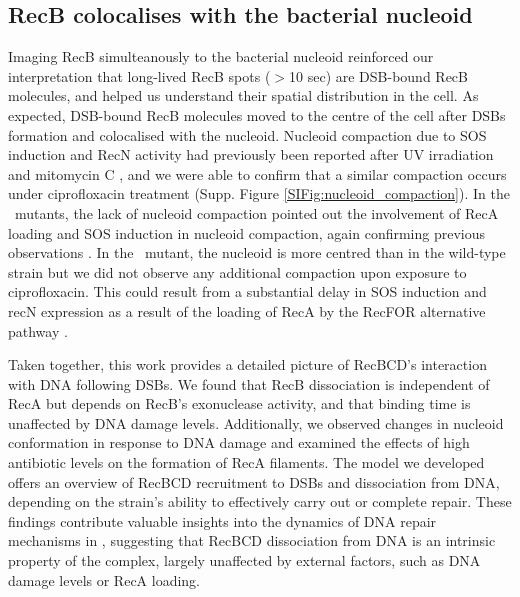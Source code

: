 \subsection*{RecB colocalises with the bacterial nucleoid}
Imaging RecB simulteanously to the bacterial nucleoid reinforced our interpretation that long-lived RecB spots ($>$10 sec) are DSB-bound RecB molecules, and helped us understand their spatial distribution in the cell. As expected, DSB-bound RecB molecules moved to the centre of the cell after DSBs formation and colocalised with the nucleoid. Nucleoid compaction due to SOS induction and RecN activity had previously been reported after UV irradiation and mitomycin C \cite{Odsbu2014,Vickridge2017}, and we were able to confirm that a similar compaction occurs under ciprofloxacin treatment (Supp. Figure \ref{SIFig:nucleoid_compaction}). In the \dreca\ mutants, the lack of nucleoid compaction pointed out the involvement of RecA loading and SOS induction in nucleoid compaction, again confirming previous observations \cite{Odsbu2014,Vickridge2017}. In the \geneteneighty\ mutant, the nucleoid is more centred than in the wild-type strain but we did not observe any additional compaction upon exposure to ciprofloxacin. This could result from a substantial delay in SOS induction and recN expression as a result of the loading of RecA by the RecFOR alternative pathway \cite{Lepore2025}.

Taken together, this work provides a detailed picture of RecBCD's interaction with DNA following DSBs. We found that RecB dissociation is independent of RecA but depends on RecB's exonuclease activity, and that binding time is unaffected by DNA damage levels. Additionally, we observed changes in nucleoid conformation in response to DNA damage and examined the effects of high antibiotic levels on the formation of RecA filaments. The model we developed offers an overview of RecBCD recruitment to DSBs and dissociation from DNA, depending on the strain's ability to effectively carry out or complete repair.
These findings contribute valuable insights into the dynamics of DNA repair mechanisms in \ecoli, suggesting that RecBCD dissociation from DNA is an intrinsic property of the complex, largely unaffected by external factors, such as DNA damage levels or RecA loading.